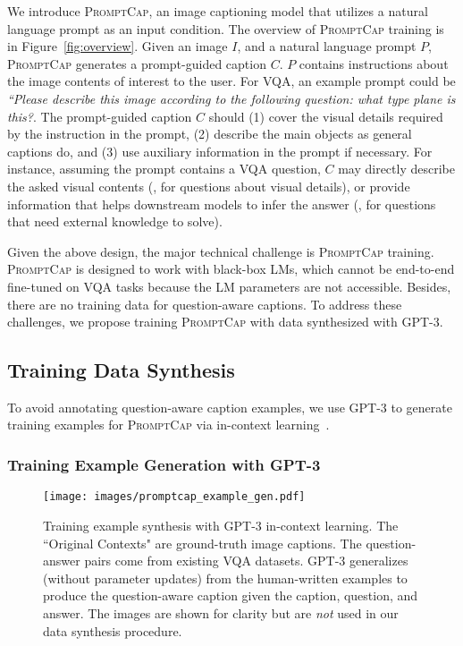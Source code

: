 \documentclass[10pt,twocolumn,letterpaper]{article}
\newcommand{\NAME}{\textsc{PromptCap}\xspace}
\begin{document}
We introduce \NAME, an image captioning model that utilizes a natural language prompt as an input condition.
The overview of \NAME training is in Figure~\ref{fig:overview}.
Given an image $I$, and a natural language prompt $P$, \NAME generates a prompt-guided caption $C$.
$P$ contains instructions about the image contents of interest to the user. 
For VQA, an example prompt could be \textit{``Please describe this image according to the following question: what type plane is this?}.
The prompt-guided caption $C$ should (1) cover the visual details required by the instruction in the prompt, (2) describe the main objects as general captions do, and (3) use auxiliary information in the prompt if necessary.
For instance, assuming the prompt contains a VQA question, $C$ may directly describe the asked visual contents (\eg, for questions about visual details), or provide information that helps downstream models to infer the answer (\eg, for questions that need external knowledge to solve). 

Given the above design, the major technical challenge is \NAME training. \NAME is designed to work with black-box LMs, which cannot be end-to-end fine-tuned on VQA tasks because the LM parameters are not accessible. Besides, there are no training data for question-aware captions. To address these challenges, we propose training \NAME with data synthesized with GPT-3. 


\subsection{Training Data Synthesis}
\label{sec:approach:example_gen}

To avoid annotating question-aware caption examples, we use GPT-3 to generate training examples for \NAME via in-context learning~\cite{brown2020language, rubin2022learning, hu-etal-2022-context, cheng2022binding}.

\vspace{-0.1in}
\subsubsection{Training Example Generation with GPT-3}

\begin{figure}[t]
\centering
  \texttt{[image: images/promptcap\_example\_gen.pdf]}
  \caption{
Training example synthesis with GPT-3 in-context learning.
The ``Original Contexts" are ground-truth image captions.
The question-answer pairs come from existing VQA datasets.
GPT-3 generalizes (without parameter updates) from the human-written examples to produce the question-aware caption given the caption, question, and answer.  The images are shown for clarity but are {\it not} used in our data synthesis procedure. 
}
  \vspace{-4mm}
  \label{fig:example_gen}
\end{figure}
\end{document}
